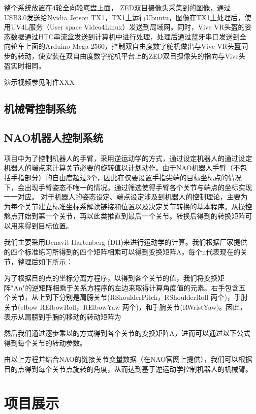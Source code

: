 整个系统放置在4轮全向轮底盘上面， ZED双目摄像头采集到的图像，通过USB3.0发送给Nvidia Jetson TX1，TX1上运行Ubuntu，图像在TX1上处理后，使用UV4L服务（User space Video4Linux）发送到局域网。同时，Vive VR头盔的姿态数据通过HTC串流盒发送到计算机中进行处理，处理后通过蓝牙串口发送到全向轮车上面的Arduino Mega 2560，控制双自由度数字舵机做出与Vive VR头盔同步的转动，使安装在双自由度数字舵机平台上的ZED双目摄像头的指向与Vive头盔实时相同。

演示视频参见附件XXX

\section{机械臂控制系统}

\section{NAO机器人控制系统}
项目中为了控制机器人的手臂，采用逆运动学的方式，通过设定机器人的通过设定机器人的端点来计算关节必要的旋转值以计划动作。由于NAO机器人手臂（不包括手指部分）的自由度超过3个，因此在仅要设置手指尖端的目标坐标点的情况下，会出现手臂姿态不唯一的情况。通过筛选使得手臂各个关节与端点的坐标实现一一对应。
对于机器人的姿态设定、端点设定涉及到机器人的控制理论，主要为为每个关节建立标准坐标系解读链接和位置以及决定关节转换的基本程序。从操控熬点开始到第一个关节，再以此类推直到最后一个关节。转换后得到的转换矩阵可以用来得到目标位置。

我们主要采用Denavit Hartenberg (DH)来进行运动学的计算。我们根据厂家提供的四个标准练习所得到的四个矩阵相乘可以得到变换矩阵A。每个n代表现在的关节，整理后如下所示：

为了根据目的点的坐标分离方程序，以得到各个关节的值，我们将变换矩阵"An"的逆矩阵相乘于关系方程序的左边来取得计算角度值的元素。右手包含五个关节，从上到下分别是肩膀关节(RShoulderPitch，RShoulderRoll 两个)，手肘关节(elbow RElbowRoll，RElbowYaw 两个)，和手腕关节(RWristYaw)。因此，表示从肩膀到手腕的移动的转动矩阵为

然后我们通过逐步乘以的方式得到各个关节的变换矩阵A，进而可以通过以下公式得到每个关节的转动参数。

由以上方程并结合NAO的链接关节变量数据（在NAO官网上提供），我们可以根据目的点得到每个关节点旋转的角度，从而达到基于逆运动学控制机器人的机械臂。



\chapter{项目展示}

